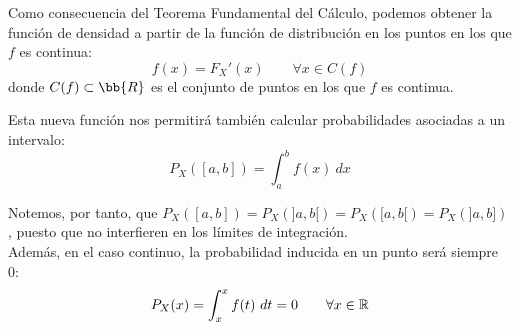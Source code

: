Como consecuencia del Teorema Fundamental del Cálculo, podemos obtener la función de densidad a partir de la función de distribución en los puntos en los que $f$ es continua:
$$f(x) = F_X'(x) \qquad \forall x \in C(f)$$
donde $C(f)\subset \bb{R}$ es el conjunto de puntos en los que $f$ es continua.

Esta nueva función nos permitirá también calcular probabilidades asociadas a un intervalo:
$$P_X([a,b]) = \int_a^b f(x)~dx$$

Notemos, por tanto, que $P_X([a,b]) = P_X(]a,b[) = P_X([a,b[) = P_X(]a,b])$, puesto que no interfieren en los límites de integración.\\

Además, en el caso continuo, la probabilidad inducida en un punto será siempre~$0$:
$$P_X(x) = \int_x^x f(t)~dt = 0 \qquad \forall x \in \mathbb R$$


